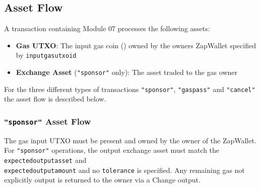 \subsection{Asset Flow}
A transaction containing Module 07 processes the following assets:

\begin{itemize}
\item \textbf{Gas UTXO}: The input gas coin () owned by the owners ZapWallet specified by \texttt{inputgasutxoid}
\item \textbf{Exchange Asset} (\texttt{"sponsor"} only): The asset traded to the gas owner
\end{itemize}

For the three different types of transactions \texttt{"sponsor"}, \texttt{"gaspass"} and \texttt{"cancel"} the asset flow is described below.\\


\subsubsection{\texttt{"sponsor"} Asset Flow}

The gas input UTXO must be present and owned by the owner of the ZapWallet. For \texttt{"sponsor"}
operations, the output exchange asset must match the \texttt{expectedoutputasset} and \\
\texttt{expectedoutputamount} and no \texttt{tolerance} is specified. Any remaining gas not explicitly output is returned
to the owner via a Change output.\\


